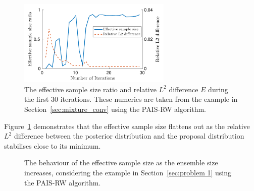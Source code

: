 \documentclass[final]{siamltex}
\begin{document}
\begin{figure}[htb]
\centering
\includegraphics[width=0.65\textwidth]{"figures/C1_burnin"}
\caption{The effective sample size ratio and relative $L^2$ difference
$E$ during the first 30 iterations. These numerics are taken from the
example in Section~\ref{sec:mixture_conv} using the PAIS-RW algorithm.}
\label{fig:neff-burnin}
\end{figure}

Figure~\ref{fig:neff-burnin} demonstrates that the effective sample
size flattens out as the relative $L^2$ difference between the
posterior distribution and the proposal distribution stabilises close
to its minimum.

\begin{figure}[htb]
\centering
{}
\caption{The behaviour of the effective sample size as the ensemble
  size increases, considering the example in Section~\ref{sec:problem 1} using the PAIS-RW algorithm.}
\label{fig:neff-M}
\end{figure}
\end{document}
